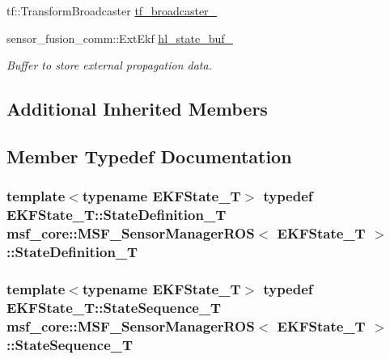 \begin{DoxyCompactItemize}
tf\-::\-Transform\-Broadcaster \hyperlink{structmsf__core_1_1MSF__SensorManagerROS_a7c53a1122c69aaf132cec3c8d81fe8e5}{tf\-\_\-broadcaster\-\_\-}
\item 
sensor\-\_\-fusion\-\_\-comm\-::\-Ext\-Ekf \hyperlink{structmsf__core_1_1MSF__SensorManagerROS_a9e4a65a73177768fa50a3fe4f67b1fd7}{hl\-\_\-state\-\_\-buf\-\_\-}
\begin{DoxyCompactList}\small\item\em Buffer to store external propagation data. \end{DoxyCompactList}\end{DoxyCompactItemize}
\subsection*{Additional Inherited Members}


\subsection{Member Typedef Documentation}
\hypertarget{structmsf__core_1_1MSF__SensorManagerROS_ad964f1aec73a553dd897068561b1400a}{
\subsubsection[{State\-Definition\-\_\-\-T}]{\setlength{\rightskip}{0pt plus 5cm}template$<$typename E\-K\-F\-State\-\_\-\-T$>$ typedef E\-K\-F\-State\-\_\-\-T\-::\-State\-Definition\-\_\-\-T {\bf msf\-\_\-core\-::\-M\-S\-F\-\_\-\-Sensor\-Manager\-R\-O\-S}$<$ E\-K\-F\-State\-\_\-\-T $>$\-::{\bf State\-Definition\-\_\-\-T}\hspace{0.3cm}{\ttfamily [private]}}}\label{structmsf__core_1_1MSF__SensorManagerROS_ad964f1aec73a553dd897068561b1400a}
\hypertarget{structmsf__core_1_1MSF__SensorManagerROS_a292181458fad0c2db275b101e5e5fd03}{
\subsubsection[{State\-Sequence\-\_\-\-T}]{\setlength{\rightskip}{0pt plus 5cm}template$<$typename E\-K\-F\-State\-\_\-\-T$>$ typedef E\-K\-F\-State\-\_\-\-T\-::\-State\-Sequence\-\_\-\-T {\bf msf\-\_\-core\-::\-M\-S\-F\-\_\-\-Sensor\-Manager\-R\-O\-S}$<$ E\-K\-F\-State\-\_\-\-T $>$\-::{\bf State\-Sequence\-\_\-\-T}\hspace{0.3cm}{\ttfamily [private]}}}\label{structmsf__core_1_1MSF__SensorManagerROS_a292181458fad0c2db275b101e5e5fd03}


